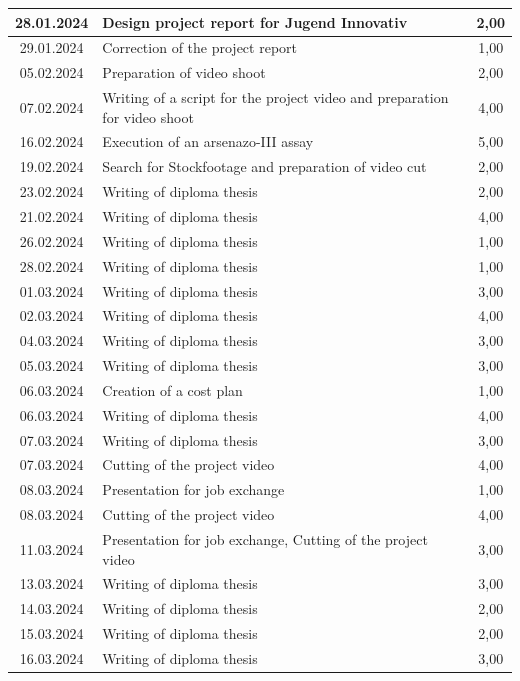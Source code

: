 \begin{longtable}{|c|p{9cm}|c|}
    28.01.2024 & Design project report for Jugend Innovativ & 2,00 \\ \hline
    29.01.2024 & Correction of the project report & 1,00 \\ \hline
    05.02.2024 & Preparation of video shoot & 2,00 \\ \hline
    07.02.2024 & Writing of a script for the project video and preparation for video shoot & 4,00 \\ \hline
    16.02.2024 & Execution of an arsenazo-III assay & 5,00 \\ \hline
    19.02.2024 & Search for Stockfootage and preparation of video cut & 2,00 \\ \hline
    23.02.2024 & Writing of diploma thesis & 2,00 \\ \hline
    21.02.2024 & Writing of diploma thesis & 4,00 \\ \hline
    26.02.2024 & Writing of diploma thesis & 1,00 \\ \hline
    28.02.2024 & Writing of diploma thesis & 1,00 \\ \hline
    01.03.2024 & Writing of diploma thesis & 3,00 \\ \hline
    02.03.2024 & Writing of diploma thesis & 4,00 \\ \hline
    04.03.2024 & Writing of diploma thesis & 3,00 \\ \hline
    05.03.2024 & Writing of diploma thesis & 3,00 \\ \hline
    06.03.2024 & Creation of a cost plan & 1,00 \\ \hline
    06.03.2024 & Writing of diploma thesis & 4,00 \\ \hline
    07.03.2024 & Writing of diploma thesis & 3,00 \\ \hline
    07.03.2024 & Cutting of the project video & 4,00 \\ \hline
    08.03.2024 & Presentation for job exchange & 1,00 \\ \hline
    08.03.2024 & Cutting of the project video & 4,00 \\ \hline
    11.03.2024 & Presentation for job exchange, Cutting of the project video & 3,00 \\ \hline
    13.03.2024 & Writing of diploma thesis & 3,00 \\ \hline
    14.03.2024 & Writing of diploma thesis & 2,00 \\ \hline
    15.03.2024 & Writing of diploma thesis & 2,00 \\ \hline
    16.03.2024 & Writing of diploma thesis & 3,00 \\ \hline

\end{longtable}

